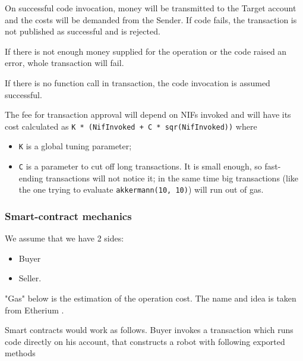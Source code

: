 On successful code invocation, money will be transmitted to the Target account and the costs will be demanded from the Sender.
If code fails, the transaction is not published as successful and is rejected.

If there is not enough money supplied for the operation or the code raised an error, whole transaction will fail.

If there is no function call in transaction, the code invocation is assumed successful.

The fee for transaction approval will depend on NIFs invoked and will have its cost calculated as \verb|K * (NifInvoked + C * sqr(NifInvoked))| where
\begin{itemize}
    \item \verb|K| is a global tuning parameter;
    \item \verb|C| is a parameter to cut off long transactions. It is small enough, so fast-ending transactions will not notice it; in the same time big transactions (like the one trying to evaluate \verb|akkermann(10, 10)|) will run out of gas.
\end{itemize}

\subsubsection{Smart-contract mechanics}

We assume that we have 2 sides:
\begin{itemize}
  \item Buyer
  \item Seller.
\end{itemize}

"Gas" below is the estimation of the operation cost. The name and idea is taken from Etherium \cite{eth}.

Smart contracts would work as follows. Buyer invokes a transaction which runs code directly on his account, that constructs a robot with following exported methods

